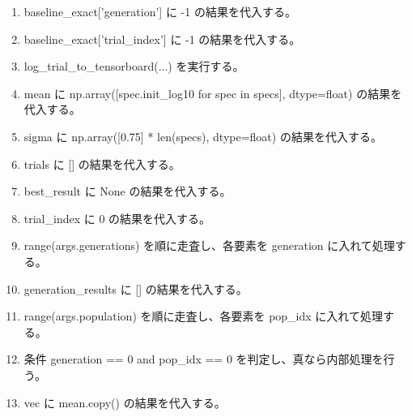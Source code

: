 \documentclass[a4paper,11pt]{article}
\begin{document}
\begin{enumerate}[leftmargin=1.8em]
\item baseline\_exact['generation'] に -1 の結果を代入する。
\item baseline\_exact['trial\_index'] に -1 の結果を代入する。
\item log\_trial\_to\_tensorboard(...) を実行する。
\item mean に np.array([spec.init\_log10 for spec in specs], dtype=float) の結果を代入する。
\item sigma に np.array([0.75] * len(specs), dtype=float) の結果を代入する。
\item trials に [] の結果を代入する。
\item best\_result に None の結果を代入する。
\item trial\_index に 0 の結果を代入する。
\item range(args.generations) を順に走査し、各要素を generation に入れて処理する。
\item   generation\_results に [] の結果を代入する。
\item   range(args.population) を順に走査し、各要素を pop\_idx に入れて処理する。
\item     条件 generation == 0 and pop\_idx == 0 を判定し、真なら内部処理を行う。
\item       vec に mean.copy() の結果を代入する。
            \end{enumerate}
\end{document}
